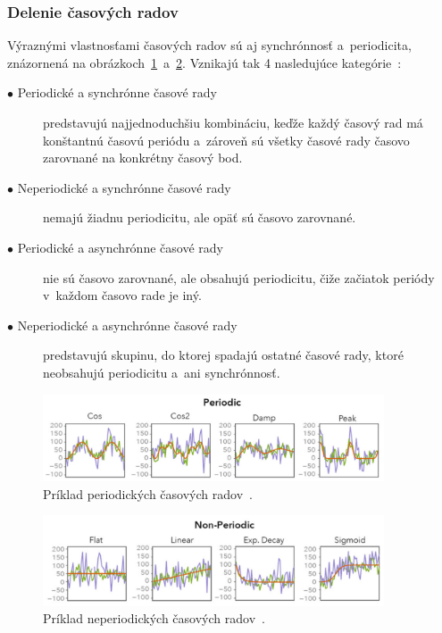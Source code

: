 \documentclass[a4paper,twoside,slovak,12pt,appendix]{article}
\begin{document}
\subsubsection{Delenie časových radov}
Výraznými vlastnosťami časových radov sú aj synchrónnosť a~periodicita,
znázornená na
obrázkoch~\ref{fig:periodic-time-series}~a~\ref{fig:non-periodic-time-series}.
Vznikajú tak 4 nasledujúce kategórie~\cite{Teng2010}:
\begin{description}
  \item[$\bullet$ Periodické a synchrónne časové rady] predstavujú
	najjednoduchšiu kombináciu, keďže každý časový rad má konštantnú časovú
	periódu a~zároveň sú všetky časové rady časovo zarovnané na konkrétny časový
	bod.
  \item[$\bullet$ Neperiodické a synchrónne časové rady] nemajú žiadnu
	periodicitu, ale opäť sú časovo zarovnané.
  \item[$\bullet$ Periodické a asynchrónne časové rady] nie sú časovo zarovnané,
	ale obsahujú periodicitu, čiže začiatok periódy v~každom časovo rade je iný.
  \item[$\bullet$ Neperiodické a asynchrónne časové rady] predstavujú skupinu,
	do ktorej spadajú ostatné časové rady, ktoré neobsahujú periodicitu a~ani
	synchrónnosť.
\end{description}

\begin{figure}[H]
  \centering
  \includegraphics[width=0.9\textwidth]{periodic_time_series.png}
  \caption{Príklad periodických časových radov~\cite{Perea2015}.}
  \label{fig:periodic-time-series}
\end{figure}

\begin{figure}[H]
  \centering
  \includegraphics[width=0.9\textwidth]{non_periodic_time_series.png}
  \caption{Príklad neperiodických časových radov~\cite{Perea2015}.}
  \label{fig:non-periodic-time-series}
\end{figure}
\end{document}

